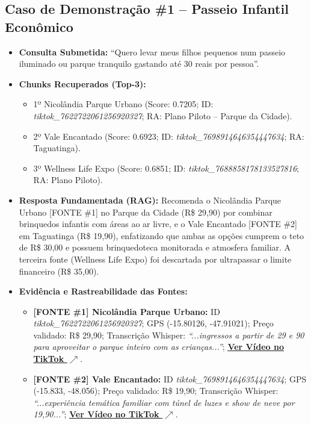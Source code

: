 \documentclass[11pt,a4paper]{article}
\begin{document}
\subsection{Caso de Demonstração \#1 -- Passeio Infantil Econômico}
\begin{itemize}[leftmargin=1.0cm]
\item \textbf{Consulta Submetida:} ``Quero levar meus filhos pequenos num passeio iluminado ou parque tranquilo gastando até 30 reais por pessoa''.
\item \textbf{Chunks Recuperados (Top-3):}
\begin{itemize}
\item 1º Nicolândia Parque Urbano (Score: 0.7205; ID: \textit{tiktok\_7622722061256920327}; RA: Plano Piloto -- Parque da Cidade).
\item 2º Vale Encantado (Score: 0.6923; ID: \textit{tiktok\_7698914646354447634}; RA: Taguatinga).
\item 3º Wellness Life Expo (Score: 0.6851; ID: \textit{tiktok\_7688858178133527816}; RA: Plano Piloto).
\end{itemize}
\item \textbf{Resposta Fundamentada (RAG):} Recomenda o Nicolândia Parque Urbano [FONTE \#1] no Parque da Cidade (R\$ 29,90) por combinar brinquedos infantis com áreas ao ar livre, e o Vale Encantado [FONTE \#2] em Taguatinga (R\$ 19,90), enfatizando que ambas as opções cumprem o teto de R\$ 30,00 e possuem brinquedoteca monitorada e atmosfera familiar. A terceira fonte (Wellness Life Expo) foi descartada por ultrapassar o limite financeiro (R\$ 35,00).
\item \textbf{Evidência e Rastreabilidade das Fontes:}
\begin{itemize}
\item \textbf{[FONTE \#1] Nicolândia Parque Urbano:} ID \textit{tiktok\_7622722061256920327}; GPS (-15.80126, -47.91021); Preço validado: R\$ 29,90; Transcrição Whisper: \textit{``...ingressos a partir de 29 e 90 para aproveitar o parque inteiro com as crianças...''}; \href{https://www.tiktok.com/@rolezandoembrasilia/video/7622722061256920327}{\textbf{\underline{Ver Vídeo no TikTok $\nearrow$}}}.
\item \textbf{[FONTE \#2] Vale Encantado:} ID \textit{tiktok\_7698914646354447634}; GPS (-15.833, -48.056); Preço validado: R\$ 19,90; Transcrição Whisper: \textit{``...experiência temática familiar com túnel de luzes e show de neve por 19,90...''}; \href{https://www.tiktok.com/@rolezandoembrasilia/video/7698914646354447634}{\textbf{\underline{Ver Vídeo no TikTok $\nearrow$}}}.
\end{itemize}
\end{itemize}
\end{document}
